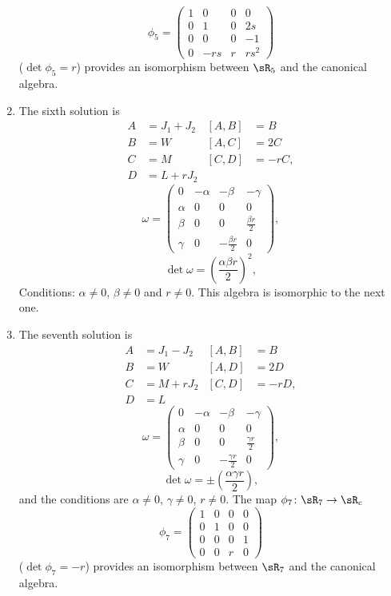 \begin{enumerate}
\begin{equation}
\phi_{5}=
\begin{pmatrix}
1&0&0&0\\
0&1&0&2s\\
0&0&0&-1\\
0&-rs&r&rs^{2}
\end{pmatrix}
\end{equation}
($\det\phi_{5}=r$) provides an isomorphism between $\sR_{5}$ and the canonical algebra.
\item The sixth solution is
\begin{align*}
A&=J_{1}+J_{2}      &[A,B]&=B\\
B&=W            &[A,C]&=2C\\
C&=M            &[C,D]&=-rC,\\
D&=L+rJ_{2}     
\end{align*}
\begin{equation}
\omega=\begin{pmatrix}
0   &-\alpha        &-\beta &-\gamma\\
\alpha  &0          &0  &0\\
\beta   &0          &0  &\frac{ \beta r }{2}\\
\gamma  &0          &-\frac{ \beta r }{2}   &0
\end{pmatrix},
\end{equation}
\begin{equation}
\det\omega=\left( \frac{ \alpha\beta r }{ 2 } \right)^2,
\end{equation}
Conditions: $\alpha\neq 0$, $\beta\neq 0$ and $r\neq 0$. This algebra is isomorphic to the next one.
\item The seventh solution is
\begin{align*}
A&=J_{1}-J_{2}      &[A,B]&=B\\
B&=W            &[A,D]&=2D\\
C&=M+rJ_{2}     &[C,D]&=-rD,\\
D&=L        
\end{align*}
\begin{equation}
\omega=\begin{pmatrix}
0   &-\alpha        &-\beta &-\gamma\\
\alpha  &0          &0  &0\\
\beta   &0          &0  &\frac{ \gamma r }{2}\\
\gamma  &0          &-\frac{ \gamma r }{2}  &0
\end{pmatrix},
\end{equation}
\begin{equation}
\det\omega=\pm\left( \frac{ \alpha\gamma r }{ 2 } \right),
\end{equation}
and the conditions are $\alpha\neq 0$, $\gamma\neq 0$, $r\neq 0$.  The map $\phi_7\colon \sR_7\to \sR_c$
\[
  \phi_{7}=
\begin{pmatrix}
1&0&0&0\\
0&1&0&0\\
0&0&0&1\\
0&0&r&0
\end{pmatrix}
\]
($\det\phi_{7}=-r$) provides an isomorphism between $\sR_{7}$ and the canonical algebra.
\end{enumerate}
